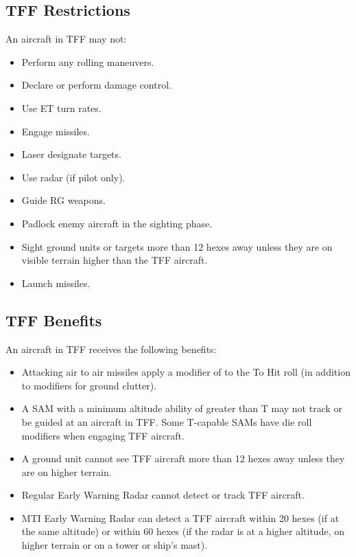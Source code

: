 \subsection{TFF Restrictions}  An aircraft in TFF may not:

\begin{itemize}
    \item Perform any rolling maneuvers.
    \item Declare or perform damage control.
    \item Use ET turn rates.
    \item Engage missiles.
    \item Laser designate targets.
    \item Use radar (if pilot only).
    \item Guide RG weapons.
    \item Padlock enemy aircraft in the sighting phase.
    \item Sight ground units or targets more than 12 hexes away unless they are on visible terrain higher than the TFF aircraft.
    \item Launch missiles.
\end{itemize}

\subsection{TFF Benefits} An aircraft in TFF receives the following benefits:

\begin{itemize}
    \item Attacking air to air missiles apply a modifier of  to the To Hit roll (in addition to modifiers for ground clutter).
    \item A SAM with a minimum altitude ability of greater than T may not track or be guided at an aircraft in TFF. Some T-capable SAMs have die roll modifiers when engaging TFF aircraft.
    \item A ground unit cannot see TFF aircraft more than 12 hexes away unless they are on higher terrain.
    \item Regular Early Warning Radar cannot detect or track TFF aircraft.
    \item MTI Early Warning Radar can detect a TFF aircraft within 20 hexes (if at the same altitude) or within 60 hexes (if the radar is at a higher altitude, on higher terrain or on a tower or ship's mast).
\end{itemize}
